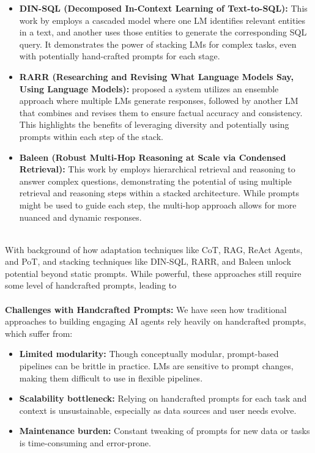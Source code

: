 \begin{itemize}

 \item \textbf{DIN-SQL (Decomposed In-Context Learning of Text-to-SQL):} This work by \parencite{pourreza2023dinsql} employs a cascaded model where one LM identifies relevant entities in a text, and another uses those entities to generate the corresponding SQL query. It demonstrates the power of stacking LMs for complex tasks, even with potentially hand-crafted prompts for each stage.

 \item \textbf{RARR (Researching and Revising What Language Models Say, Using Language Models):} \parencite{luyu2023} proposed a system utilizes an ensemble approach where multiple LMs generate responses, followed by another LM that combines and revises them to ensure factual accuracy and consistency. This highlights the benefits of leveraging diversity and potentially using prompts within each step of the stack.

 \item \textbf{Baleen (Robust Multi-Hop Reasoning at Scale via Condensed Retrieval):} This work by \parencite{Khattab2021} employs hierarchical retrieval and reasoning to answer complex questions, demonstrating the potential of using multiple retrieval and reasoning steps within a stacked architecture. While prompts might be used to guide each step, the multi-hop approach allows for more nuanced and dynamic responses.
\end{itemize}
\\
With background of how adaptation techniques like CoT, RAG, ReAct Agents, and PoT, and stacking techniques like DIN-SQL, RARR, and Baleen unlock potential beyond static prompts. While powerful, these approaches still require some level of handcrafted prompts, leading to\\
\\
\textbf{Challenges with Handcrafted Prompts:}
We have seen how traditional approaches to building engaging AI agents rely heavily on handcrafted prompts, which suffer from:
\begin{itemize}
    \item \textbf{Limited modularity:} Though conceptually modular, prompt-based pipelines can be brittle in practice. LMs are sensitive to prompt changes, making them difficult to use in flexible pipelines.

    \item \textbf{Scalability bottleneck:} Relying on handcrafted prompts for each task and context is unsustainable, especially as data sources and user needs evolve.

    \item \textbf{Maintenance burden:} Constant tweaking of prompts for new data or tasks is time-consuming and error-prone.
\end{itemize}
